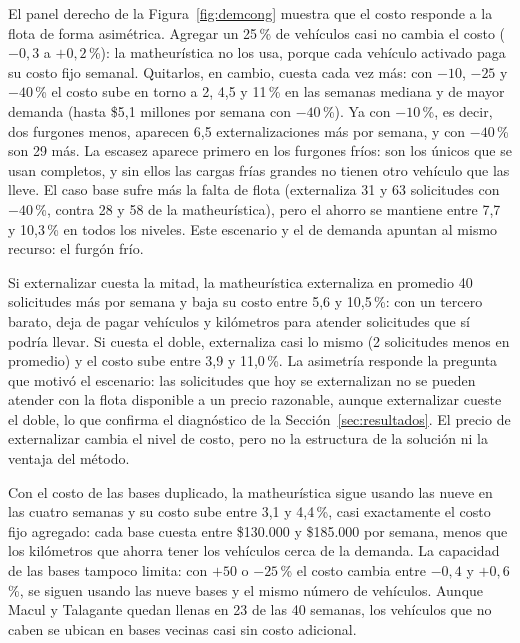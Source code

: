  El panel derecho de la Figura~\ref{fig:demcong} muestra que el costo responde a la flota de forma asimétrica. Agregar un 25\,\% de vehículos casi no cambia el costo ($-0{,}3$ a $+0{,}2$\,\%): la matheurística no los usa, porque cada vehículo activado paga su costo fijo semanal. Quitarlos, en cambio, cuesta cada vez más: con $-10$, $-25$ y $-40$\,\% el costo sube en torno a 2, 4,5 y 11\,\% en las semanas mediana y de mayor demanda (hasta \$5,1 millones por semana con $-40$\,\%). Ya con $-10$\,\%, es decir, dos furgones menos, aparecen 6,5 externalizaciones más por semana, y con $-40$\,\% son 29 más. La escasez aparece primero en los furgones fríos: son los únicos que se usan completos, y sin ellos las cargas frías grandes no tienen otro vehículo que las lleve. El caso base sufre más la falta de flota (externaliza 31 y 63 solicitudes con $-40$\,\%, contra 28 y 58 de la matheurística), pero el ahorro se mantiene entre 7,7 y 10,3\,\% en todos los niveles. Este escenario y el de demanda apuntan al mismo recurso: el furgón frío.

 Si externalizar cuesta la mitad, la matheurística externaliza en promedio 40 solicitudes más por semana y baja su costo entre 5,6 y 10,5\,\%: con un tercero barato, deja de pagar vehículos y kilómetros para atender solicitudes que sí podría llevar. Si cuesta el doble, externaliza casi lo mismo (2 solicitudes menos en promedio) y el costo sube entre 3,9 y 11,0\,\%. La asimetría responde la pregunta que motivó el escenario: las solicitudes que hoy se externalizan no se pueden atender con la flota disponible a un precio razonable, aunque externalizar cueste el doble, lo que confirma el diagnóstico de la Sección~\ref{sec:resultados}. El precio de externalizar cambia el nivel de costo, pero no la estructura de la solución ni la ventaja del método.

 Con el costo de las bases duplicado, la matheurística sigue usando las nueve en las cuatro semanas y su costo sube entre 3,1 y 4,4\,\%, casi exactamente el costo fijo agregado: cada base cuesta entre \$130.000 y \$185.000 por semana, menos que los kilómetros que ahorra tener los vehículos cerca de la demanda. La capacidad de las bases tampoco limita: con $+50$ o $-25$\,\% el costo cambia entre $-0{,}4$ y $+0{,}6$\,\%, se siguen usando las nueve bases y el mismo número de vehículos. Aunque Macul y Talagante quedan llenas en 23 de las 40 semanas, los vehículos que no caben se ubican en bases vecinas casi sin costo adicional.

